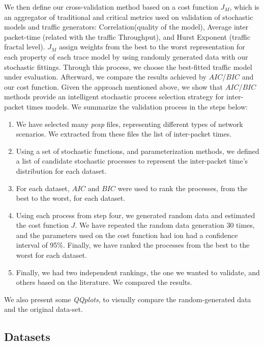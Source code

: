 We then define our cross-validation method based on a cost function $J_M$,  which is an aggregator of traditional and critical metrics used on validation of stochastic models and traffic generators: Correlation(quality of the model), Average inter packet-time (related with the traffic Throughput), and Hurst Exponent (traffic fractal level).  $J_M$ assign weights from the best to the worst representation for each property of each trace model by using randomly generated data with our stochastic fittings. Through this process, we choose the best-fitted traffic model under evaluation. Afterward, we compare the results achieved by $AIC$/$BIC$ and our cost function. Given the approach mentioned above, we show that $AIC$/$BIC$ methods provide an intelligent stochastic process selection strategy for inter-packet times models.
We summarize the validation process in the steps below:
\begin{enumerate}
\item We have selected many \textit{pcap} files, representing different types of network scenarios. We extracted from these files the list of inter-packet times.
\item Using a set of stochastic functions, and parameterization methods, we defined a list of candidate stochastic processes to represent the inter-packet time's distribution for each dataset.
\item For each dataset, $AIC$ and $BIC$  were used to rank the processes, from the best to the worst, for each dataset.
\item Using each process from step four,  we generated random data and estimated the cost function $J$. We have repeated the random data generation  30 times, and the parameters used on the cost function had ion had a confidence interval of 95\%. Finally, we have ranked the processes from the best to the worst for each dataset.
\item Finally, we had two independent rankings, the one we wanted to validate, and others based on the literature. We compared the results.
\end{enumerate}
  
We also present some \textit{QQplots}, to visually compare the random-generated data and the original data-set. 


\subsection{Datasets}


